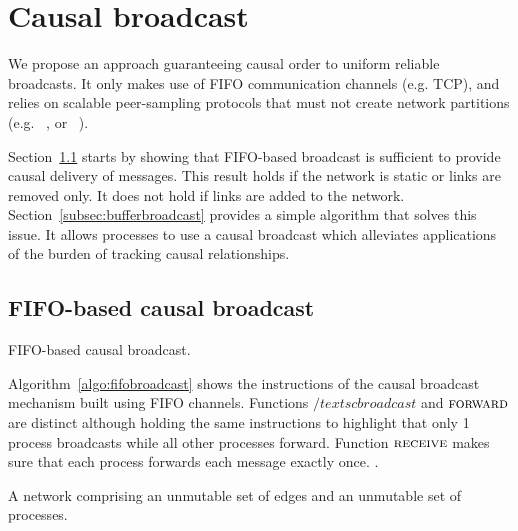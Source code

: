 
\section{Causal broadcast}
\label{sec:proposal}

We propose an approach guaranteeing causal order to uniform reliable
broadcasts. It only makes use of FIFO communication channels (e.g. TCP), and
relies on scalable peer-sampling protocols that must not create network partitions
(e.g. \SPRAY~\cite{nedelec2017adaptive}, or \CYCLON~\cite{voulgaris2005cyclon}).

Section~\ref{subsec:fifobroadcast} starts by showing that FIFO-based broadcast
is sufficient to provide causal delivery of messages. This result holds if the
network is static or links are removed only. It does not hold if links are added
to the network. Section~\ref{subsec:bufferbroadcast} provides a simple algorithm
that solves this issue. It allows processes to use a causal broadcast which
alleviates applications of the burden of tracking causal relationships.

\subsection{FIFO-based causal broadcast}
\label{subsec:fifobroadcast}

\begin{definition}
  
\end{definition}


\begin{algorithm}[h]
  
  \caption{\label{algo:fifobroadcast}FIFO-based causal broadcast.}
\end{algorithm}

Algorithm~\ref{algo:fifobroadcast} shows the instructions of the causal
broadcast mechanism built using FIFO channels. Functions $/textsc{broadcast}$
and $\textsc{forward}$ are distinct although holding the same instructions to
highlight that only 1 process broadcasts while all other processes
forward. Function $\textsc{receive}$ makes sure that each process forwards each
message exactly once. .


\begin{definition}
  A network comprising an unmutable set of edges and an unmutable set of
  processes.
\end{definition}


